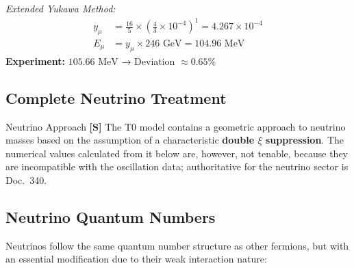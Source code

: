 	\textit{Extended Yukawa Method:}
	\begin{align}
		y_\mu &= \frac{16}{5} \times \left(\frac{4}{3} \times 10^{-4}\right)^1 = 4.267 \times 10^{-4} \\
		E_\mu &= y_\mu \times 246 \text{ GeV} = 104.96 \text{ MeV}
	\end{align}
	\textbf{Experiment:} $105.66 \text{ MeV}$ → Deviation $\approx 0.65\%$
	
	\subsection{Complete Neutrino Treatment}
	\label{sec:complete_neutrino_treatment}
	
	\begin{neutrino}{Neutrino Approach}{}
		\textbf{[S]} The T0 model contains a geometric approach to neutrino masses based on the assumption of a characteristic \textbf{double $\xi$ suppression}. The numerical values calculated from it below are, however, not tenable, because they are incompatible with the oscillation data; authoritative for the neutrino sector is Doc.~340.
	\end{neutrino}
	
	\subsection{Neutrino Quantum Numbers}
	\label{subsec:neutrino_quantum_numbers}
	
	Neutrinos follow the same quantum number structure as other fermions, but with an essential modification due to their weak interaction nature:
	
	\begin{table}[H]
		\centering


		\caption{Neutrino quantum numbers with characteristic double $\xi$ suppression}
		\label{tab:neutrino_quantum_numbers}
	\end{table}
	
